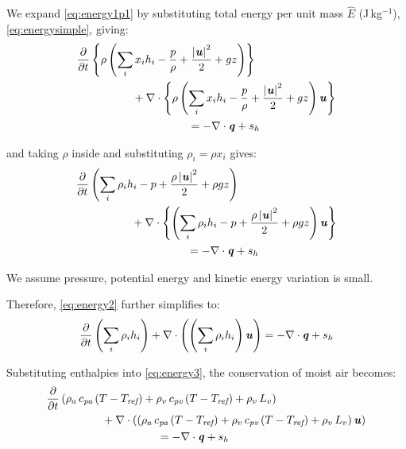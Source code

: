 We expand \ref{eq:energy1p1} by substituting total energy per unit mass $\hat{E}$ (J\,kg$^{-1}$), \ref{eq:energysimple}, giving:
\begin{equation}
\begin{split}
&\frac{\partial }{\partial t} \left\{\rho \left( \sum_i x_i h_i  - \frac{p}{\rho} + \frac{\left| \mvec{u} \right|^2}{2} + gz  \right) \right\}\\
& \hspace{5em} + \nabla  \cdot \left\{ \rho \left(   \sum_i x_i h_i  - \frac{p}{\rho} + \frac{\left| \mvec{u} \right|^2}{2} + gz  \right) \mvec{u} \right\} \\
& \hspace{10em}  =  - \nabla  \cdot \mvec{q} + s_h
\end{split}
\end{equation}


and taking $\rho$ inside and substituting $\rho_i = \rho x_i $ gives:
\begin{equation}
\begin{split}
&\frac{\partial }{\partial t} \left( \sum_i \rho_i h_i  - p + \frac{\rho \left| \mvec{u} \right|^2}{2} + \rho gz  \right) \\
& \hspace{5em} + \nabla  \cdot \left\{ \left(   \sum_i \rho_i h_i  - p + \frac{\rho \left| \mvec{u} \right|^2}{2} + \rho gz  \right) \mvec{u} \right\} \\
& \hspace{10em} =  - \nabla  \cdot \mvec{q} + s_h
\end{split}
\label{eq:energy2}
\end{equation}

\begin{assumption}
	We assume pressure, potential energy and kinetic energy variation is small. 
\end{assumption}	

Therefore, \cref{eq:energy2} further simplifies to:
\begin{equation}
\frac{\partial }{\partial t} \left( \sum_i \rho_i h_i \right) +   \nabla  \cdot \left( \left( \sum_i \rho_i h_i \right)\textbf{\textit{u}}\right) =  - \nabla  \cdot \textbf{\textit{q}} + s_h
\label{eq:energy3}
\end{equation}

Substituting enthalpies into \cref{eq:energy3}, the conservation of moist air becomes:
\begin{equation}
\begin{split}
&\frac{\partial }{\partial t} \left( \rho_a\,c_{\textit{pa}}\left(T - T_{\textit{ref}}\right) +  \rho_v\,c_{\textit{pv}} \left(T - T_{\textit{ref}}\right) + \rho_v\, L_v \right)\\
&  \hspace{5em} + \nabla  \cdot \left( \left( \rho_a\,c_{\textit{pa}}\left(T - T_{\textit{ref}}\right) +  \rho_v\,c_{\textit{pv}} \left(T - T_{\textit{ref}}\right) + \rho_v\, L_v \right) \mvec{u}\right)\\
& \hspace{10em} =  - \nabla  \cdot \mvec{q} + s_h
\end{split}
\label{eq:energy4}
\end{equation}


